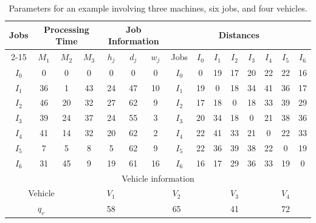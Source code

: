 \documentclass{article}
\begin{document}
\begin{table}
\centering

\caption{ Parameters for an example involving three machines, six jobs, and four vehicles.\label{tab:InfoInstancia}} 
{ 
\centering
\begin{tabular}{|ccccccccccccccc|}
\hline
\multicolumn{1}{|c|}{\multirow{2}{*}{Jobs}} & \multicolumn{3}{c|}{Processing Time} & \multicolumn{3}{c|}{Job Information} & \multicolumn{8}{c|}{Distances} \\ \cline{2-15} 
\multicolumn{1}{|c|}{} & $M_1$ & $M_2$ & \multicolumn{1}{c|}{$M_3$} & $h_j$ & $d_j$ & \multicolumn{1}{c|}{$w_j$} & \multicolumn{1}{c|}{Jobs} & $I_0$ & $I_1$  & $I_2$ & $I_3$ & $I_4$  & $I_5$  & $I_6$ \\ \hline
\multicolumn{1}{|c|}{$I_0$} & 0 & 0 & \multicolumn{1}{c|}{0} & 0 & 0 & \multicolumn{1}{c|}{0} & \multicolumn{1}{c|}{$I_0$} & 0 & 19  & 17 & 20 & 22  & 22  & 16 \\
\multicolumn{1}{|c|}{$I_1$} & 36 & 1 & \multicolumn{1}{c|}{43} & 24 & 47 & \multicolumn{1}{c|}{10} & \multicolumn{1}{c|}{$I_1$} & 19 & 0  & 18 & 34 & 41  & 36  & 17 \\
\multicolumn{1}{|c|}{$I_2$} & 46 & 20 & \multicolumn{1}{c|}{32} & 27 & 62 & \multicolumn{1}{c|}{9} & \multicolumn{1}{c|}{$I_2$} & 17 & 18  & 0  & 18 & 33  & 39  & 29 \\
\multicolumn{1}{|c|}{$I_3$} & 39 & 24 & \multicolumn{1}{c|}{37} & 24 & 55 & \multicolumn{1}{c|}{3} & \multicolumn{1}{c|}{$I_3$} & 20 & 34  & 18 & 0  & 21  & 38  & 36 \\
\multicolumn{1}{|c|}{$I_4$} & 41 & 14 & \multicolumn{1}{c|}{32} & 20 & 62 & \multicolumn{1}{c|}{2} & \multicolumn{1}{c|}{$I_4$} & 22 & 41  & 33 & 21 & 0  & 22  & 33 \\
\multicolumn{1}{|c|}{$I_5$} & 7 & 5 & \multicolumn{1}{c|}{8} & 5 & 62 & \multicolumn{1}{c|}{9} & \multicolumn{1}{c|}{$I_5$} & 22 & 36  & 39 & 38 & 22  & 0  & 19 \\
\multicolumn{1}{|c|}{$I_6$} & 31 & 45 & \multicolumn{1}{c|}{9} & 19 & 61 & \multicolumn{1}{c|}{16} & \multicolumn{1}{c|}{$I_6$} & 16 & 17  & 29 & 36 & 33  & 19  & 0  \\ \hline
\multicolumn{15}{|c|}{Vehicle information}   \\ \hline
\multicolumn{3}{|c|}{Vehicle}  & \multicolumn{3}{c}{$V_1$} & \multicolumn{3}{c}{$V_2$}  & \multicolumn{3}{c}{$V_3$} & \multicolumn{3}{c|}{$V_4$} \\ \hline
\multicolumn{3}{|c|}{$q_v$} & \multicolumn{3}{c}{58} & \multicolumn{3}{c}{65}  & \multicolumn{3}{c}{41} & \multicolumn{3}{c|}{72} \\ \hline
\end{tabular}
}{}
\end{table}
\end{document}
